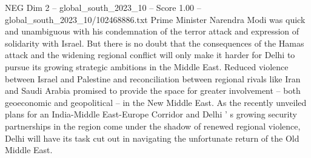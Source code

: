 \begin{textsample}{NEG Dim 2 – global\_south\_2023\_10 – Score 1.00 – global\_south\_2023\_10/102468886.txt}
Prime Minister Narendra Modi was quick and unambiguous with his condemnation of the terror attack and expression of solidarity with Israel.
But there is no doubt that the consequences of the Hamas attack and the widening regional conflict will only make it harder for Delhi to pursue its growing strategic ambitions in the Middle East.
Reduced violence between Israel and Palestine and reconciliation between regional rivals like Iran and Saudi Arabia promised to provide the space for greater involvement -- both geoeconomic and geopolitical -- in the New Middle East.
As the recently unveiled plans for an India-Middle East-Europe Corridor and Delhi ' s growing security partnerships in the region come under the shadow of renewed regional violence, Delhi will have its task cut out in navigating the unfortunate return of the Old Middle East.

\end{textsample}

